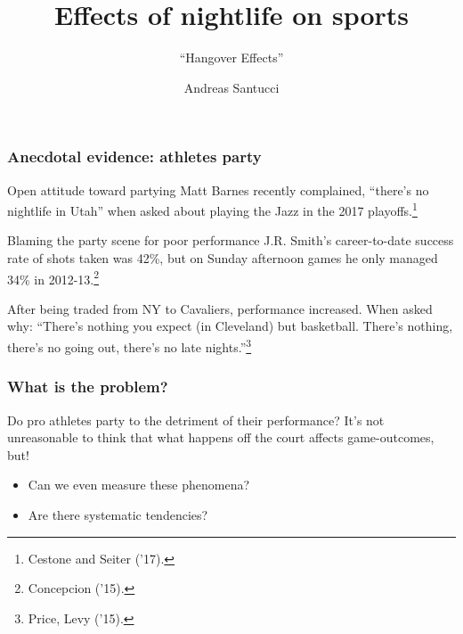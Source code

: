 \documentclass{beamer}
\author{Andreas Santucci} \institute{Stanford Teaching Fellow \\ Computational Math, Data Science} \title{Effects of nightlife on sports} \subtitle{``Hangover Effects''} %
\begin{document}
  \begin{frame} \maketitle \end{frame}

\begin{frame}   \frametitle{Anecdotal evidence: athletes party}
  \begin{block}{Open attitude toward partying}     Matt Barnes recently complained, ``there's no nightlife in Utah'' when asked
    about playing the Jazz in the 2017 playoffs.\footnote{Cestone and Seiter ('17).}   \end{block}

  \vspace{12pt}
  \begin{block}{Blaming the party scene for poor performance}
    J.R. Smith's career-to-date success rate of shots taken was 42\%, 
    but on Sunday afternoon games he only managed 34\% in 2012-13.\footnote{Concepcion ('15).}

    \vspace{12pt}
    After being traded from NY to Cavaliers, performance increased.
    When asked why: ``There’s nothing you expect (in Cleveland) but basketball. 
    There’s nothing, there’s no going out, there’s no late nights.''\footnote{Price, Levy ('15).}
  \end{block} 
\end{frame}



\begin{frame}   \frametitle{What is the problem?}
  \begin{block}{Do pro athletes party to the detriment of their performance?}     It's not unreasonable to think that what happens off the court affects game-outcomes, but!
    \begin{itemize}       
      \item Can we even measure these phenomena?
      \item Are there systematic tendencies?
    \end{itemize}       \end{block}
\end{frame}
\end{document}
